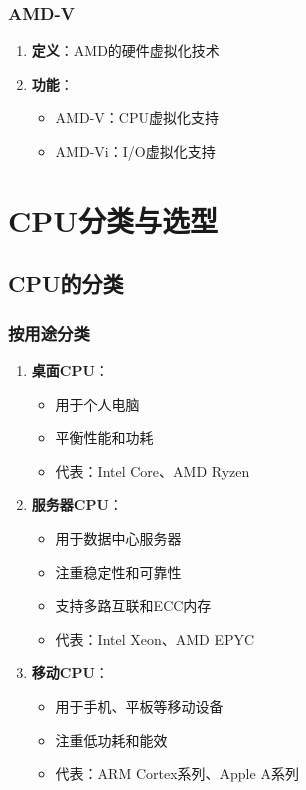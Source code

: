\documentclass[12pt,UTF8]{ctexbook}
\begin{document}
\section{AMD-V}

\begin{enumerate}
    \item \textbf{定义}：AMD的硬件虚拟化技术
    \item \textbf{功能}：
    \begin{itemize}[leftmargin=2em]
        \item AMD-V：CPU虚拟化支持
        \item AMD-Vi：I/O虚拟化支持
    \end{itemize}
\end{enumerate}

\part{CPU分类与选型}

\chapter{CPU的分类}

\section{按用途分类}

\begin{enumerate}
    \item \textbf{桌面CPU}：
    \begin{itemize}[leftmargin=2em]
        \item 用于个人电脑
        \item 平衡性能和功耗
        \item 代表：Intel Core、AMD Ryzen
    \end{itemize}
    
    \item \textbf{服务器CPU}：
    \begin{itemize}[leftmargin=2em]
        \item 用于数据中心服务器
        \item 注重稳定性和可靠性
        \item 支持多路互联和ECC内存
        \item 代表：Intel Xeon、AMD EPYC
    \end{itemize}
    
    \item \textbf{移动CPU}：
    \begin{itemize}[leftmargin=2em]
        \item 用于手机、平板等移动设备
        \item 注重低功耗和能效
        \item 代表：ARM Cortex系列、Apple A系列
    \end{itemize}
\end{enumerate}
\end{document}

